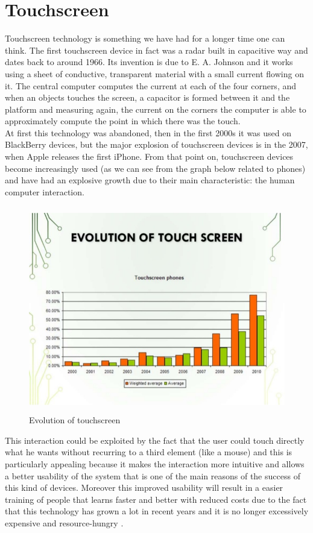 \section{Touchscreen}
Touchscreen technology is something we have had for a longer time one can think. The first touchscreen device in fact was a radar built in capacitive way and dates back to around 1966. Its invention is due to E. A. Johnson and it works using a sheet of conductive, transparent material with a small current flowing on it. The central computer computes the current at each of the four corners, and when an objects touches the screen, a capacitor is formed between it and the platform and measuring again, the current on the corners the computer is able to approximately compute the point in which there was the touch.\\
At first this technology was abandoned, then in the first 2000s it was used on BlackBerry devices, but the major explosion of touchscreen devices is in the 2007, when Apple releases the first iPhone. \cite{Infante}
From that point on, touchscreen devices become increasingly used (as we can see from the graph below related to phones) and have had an explosive growth due to their main characteristic: the human computer interaction.
\begin{figure}[H]
\centering
\includegraphics[width=12cm, height=9cm]{immagini/evolutouch.jpg}
\caption{Evolution of touchscreen}\label{fig:evolutouch}
\end{figure}
This interaction could be exploited by the fact that the user could touch directly what he wants without recurring to a third element (like a mouse) and this is particularly appealing because it makes the interaction more intuitive and allows a better usability of the system that is one of the main reasons of the success of this kind of devices. Moreover this improved usability will result in a easier training of people that learns faster and better with reduced costs due to the fact that this technology has grown a lot in recent years and it is no longer excessively expensive and resource-hungry \cite{Creed}.

